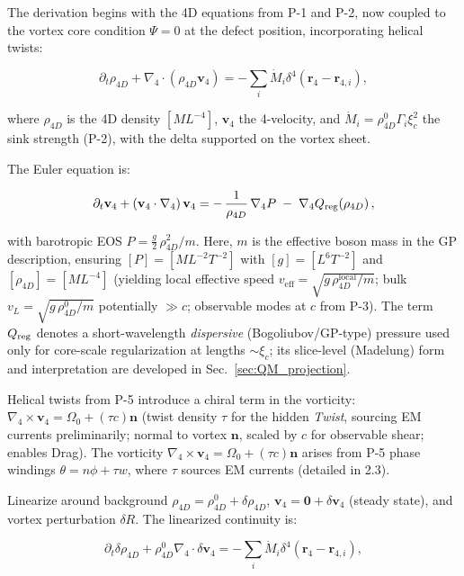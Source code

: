 The derivation begins with the 4D equations from P-1 and P-2, now coupled to the vortex core condition $\Psi=0$ at the defect position, incorporating helical twists:

\begin{equation}
\partial_t \rho_{4D} + \nabla_4 \cdot (\rho_{4D} \mathbf{v}_4) = -\sum_i \dot{M}_i \delta^4(\mathbf{r}_4 - \mathbf{r}_{4,i}),
\end{equation}

where $\rho_{4D}$ is the 4D density $[M L^{-4}]$, $\mathbf{v}_4$ the 4-velocity, and $\dot{M}_i = \rho_{4D}^0 \Gamma_i \xi_c^2$ the sink strength (P-2), with the delta supported on the vortex sheet.

The Euler equation is:

\begin{equation}
\partial_t \mathbf{v}_4 + (\mathbf{v}_4 \cdot \nabla_4)\,\mathbf{v}_4
= -\,\frac{1}{\rho_{4D}}\,\nabla_4 P \;-\; \nabla_4 Q_{\rm reg}(\rho_{4D})\,,
\end{equation}

with barotropic EOS $P=\tfrac{g}{2}\,\rho_{4D}^2/m$. Here, $m$ is the effective boson mass in the GP description, ensuring $[P]=[M L^{-2}T^{-2}]$ with $[g]=[L^6T^{-2}]$ and $[\rho_{4D}]=[M L^{-4}]$ (yielding local effective speed $v_{\text{eff}}=\sqrt{g\,\rho_{4D}^{\text{local}}/m}$; bulk $v_L=\sqrt{g\,\rho_{4D}^0/m}$ potentially $\gg c$; observable modes at $c$ from P-3). The term $Q_{\rm reg}$ denotes a short-wavelength \emph{dispersive} (Bogoliubov/GP-type) pressure used only for core-scale regularization at lengths $\sim\xi_c$; its slice-level (Madelung) form and interpretation are developed in Sec.~\ref{sec:QM_projection}.

Helical twists from P-5 introduce a chiral term in the vorticity: $\nabla_4 \times \mathbf{v}_4 = \Omega_0 + (\tau c) \mathbf{n}$ (twist density $\tau$ for the hidden \emph{Twist}, sourcing EM currents preliminarily; normal to vortex $\mathbf{n}$, scaled by $c$ for observable shear; enables Drag). The vorticity $\nabla_4 \times \mathbf{v}_4 = \Omega_0 + (\tau c) \mathbf{n}$ arises from P-5 phase windings $\theta = n\phi + \tau w$, where $\tau$ sources EM currents (detailed in 2.3).

Linearize around background $\rho_{4D} = \rho_{4D}^0 + \delta \rho_{4D}$, $\mathbf{v}_4 = \mathbf{0} + \delta \mathbf{v}_4$ (steady state), and vortex perturbation $\delta R$. The linearized continuity is:

\begin{equation}
\partial_t \delta \rho_{4D} + \rho_{4D}^0 \nabla_4 \cdot \delta \mathbf{v}_4 = -\sum_i \dot{M}_i \delta^4(\mathbf{r}_4 - \mathbf{r}_{4,i}),
\end{equation}

